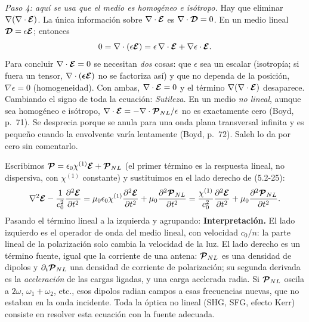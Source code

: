 \emph{Paso 4: aquí se usa que el medio es homogéneo e isótropo.} Hay que eliminar
$\nabla(\nabla\cdot\boldsymbol{\mathcal E})$. La única información sobre $\nabla\cdot\boldsymbol{\mathcal E}$ es $\nabla\cdot\boldsymbol{\mathcal D}=0$. En un medio
lineal $\boldsymbol{\mathcal D}=\epsilon\boldsymbol{\mathcal E}$; entonces
\begin{equation*}
0=\nabla\cdot(\epsilon\boldsymbol{\mathcal E})=\epsilon\,\nabla\cdot\boldsymbol{\mathcal E}+\nabla\epsilon\cdot\boldsymbol{\mathcal E} .
\end{equation*}
Para concluir $\nabla\cdot\boldsymbol{\mathcal E}=0$ se necesitan \emph{dos} cosas: que $\epsilon$ sea un escalar (isotropía;
si fuera un tensor, $\nabla\cdot(\boldsymbol\epsilon\boldsymbol{\mathcal E})$ no se factoriza así) y que no dependa de la
posición, $\nabla\epsilon=0$ (homogeneidad). Con ambas, $\nabla\cdot\boldsymbol{\mathcal E}=0$ y el término
$\nabla(\nabla\cdot\boldsymbol{\mathcal E})$ desaparece. Cambiando el signo de toda la ecuación:
\emph{Sutileza.} En un medio \emph{no lineal}, aunque sea homogéneo e isótropo,
$\nabla\cdot\boldsymbol{\mathcal E}=-\nabla\cdot\boldsymbol{\mathcal P}_{NL}/\epsilon$ no es exactamente cero (Boyd, p.~71). Se desprecia
porque se anula para una onda plana transversal infinita y es pequeño cuando la envolvente varía
lentamente (Boyd, p.~72). Saleh lo da por cero sin comentarlo.

 Escribimos $\boldsymbol{\mathcal P}=\epsilon_0\chi^{(1)}\boldsymbol{\mathcal E}+\boldsymbol{\mathcal P}_{NL}$ (el primer término es la respuesta lineal,
no dispersiva, con $\chi^{(1)}$ constante) y sustituimos en el lado derecho de (5.2-25):
\begin{equation*}
\nabla^2\boldsymbol{\mathcal E}-\frac{1}{c_0^2}\frac{\partial^2\boldsymbol{\mathcal E}}{\partial t^2}
=\mu_0\epsilon_0\chi^{(1)}\frac{\partial^2\boldsymbol{\mathcal E}}{\partial t^2}+\mu_0\frac{\partial^2\boldsymbol{\mathcal P}_{NL}}{\partial t^2}
=\frac{\chi^{(1)}}{c_0^2}\frac{\partial^2\boldsymbol{\mathcal E}}{\partial t^2}+\mu_0\frac{\partial^2\boldsymbol{\mathcal P}_{NL}}{\partial t^2}.
\end{equation*}
Pasando el término lineal a la izquierda y agrupando:
\textbf{Interpretación.} El lado izquierdo es el operador de onda del medio lineal, con velocidad
$c_0/n$: la parte lineal de la polarización solo cambia la velocidad de la luz. El lado derecho es
un término fuente, igual que la corriente de una antena: $\boldsymbol{\mathcal P}_{NL}$ es una densidad de dipolos y
$\partial_t\boldsymbol{\mathcal P}_{NL}$ una densidad de corriente de polarización; su segunda derivada es la
\emph{aceleración} de las cargas ligadas, y una carga acelerada radia. Si $\boldsymbol{\mathcal P}_{NL}$ oscila a
$2\omega$, $\omega_1+\omega_2$, etc., esos dipolos radian campos a esas frecuencias nuevas, que no
estaban en la onda incidente. Toda la óptica no lineal (SHG, SFG, efecto Kerr) consiste en resolver
esta ecuación con la fuente adecuada.

